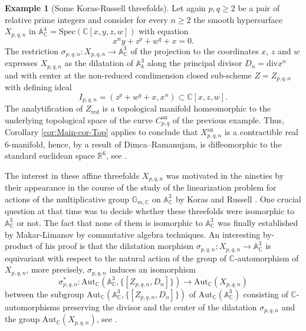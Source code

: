 \documentclass[10pt]{alggeom}
\renewcommand{\geq}{\geqslant}
\theoremstyle{definition}
\newtheorem{ex}[thm]{Example}
\numberwithin{equation}{section}
\begin{document}
\begin{ex}[Some Koras-Russell threefolds]
\label{exa:-KR-threefolds} Let again $p,q\geq2$ be a pair of relative
prime integers and consider for every $n\geq2$ the smooth hypersurface
$X_{p,q,n}$ in $\mathbb{A}_{\mathbb{C}}^{4}=\mathrm{Spec}(\mathbb{C}[x,y,z,w])$
with equation 
\[
x^{n}y+z^{p}+w^{q}+x=0.
\]
The restriction $\sigma_{p,q,n}:X_{p,q,n}\to\mathbb{A}_{\mathbb{C}}^{3}$
of the projection to the coordinates $x$, $z$ and $w$ expresses
$X_{p,q,n}$ as the dilatation of $\mathbb{A}_{k}^{3}$ along the
principal divisor $D_{n}=\mathrm{div}x^{n}$ and with center at the
non-reduced condimension closed sub-scheme $Z=Z_{p,q,n}$ with defining
ideal $$I_{p,q,n}=(z^{p}+w^{q}+x,x^{n})\subset\mathbb{C}[x,z,w].$$
The analytification of $Z_{\mathrm{red}}$ is a topological manifold
homeomorphic to the underlying topological space of the curve $C_{p,q}^{\mathrm{an}}$
of the previous example. Thus, Corollary \ref{cor:Main-cor-Top} applies
to conclude that $X_{p,q,n}^{\mathrm{an}}$ is a contractible real
$6$-manifold, hence, by a result of Dimca--Ramanujam, is diffeomorphic
to the standard euclidean space $\mathbb{R}^{6}$, see \cite[Theorem 3.2]{Zai00}. 

The interest in these affine threefolds $X_{p,q,n}$ was motivated
in the nineties by their appearance in the course of the study of
the linearization problem for actions of the multiplicative group $\mathbb{G}_{m,\mathbb{C}}$ on $\mathbb{A}_{\mathbb{C}}^{3}$
by Koras and Russell \cite{KR97}. One crucial question at that time
was to decide whether these threefolds were isomorphic to $\mathbb{A}_{\mathbb{C}}^{3}$
or not. The fact that none of them is isomorphic to $\mathbb{A}_{\mathbb{C}}^{3}$
was finally established by Makar-Limanov \cite{ML96} by commutative
algebra techniques. An interesting by-product of his proof is that
the dilatation morphism $\sigma_{p,q,n}:X_{p,q,n}\to\mathbb{A}_{\mathbb{C}}^{3}$
is equivariant with respect to the natural action of the group of
$\mathbb{C}$-automorphism of $X_{p,q,n}$, more precisely, $\sigma_{p,q,n}$
induces an isomorphism 
\[
\sigma_{p,q,n}^{*}:\mathrm{Aut}_{\mathbb{C}}(\mathbb{A}_{\mathbb{C}}^{3},\{[Z_{p,q,n},D_{n}]\})\to\mathrm{Aut}_{\mathbb{C}}(X_{p,q,n})
\]
between the subgroup $\mathrm{Aut}_{\mathbb{C}}(\mathbb{A}_{\mathbb{C}}^{3},\{[Z_{p,q,n},D_{n}]\})$
of $\mathrm{Aut}_{\mathbb{C}}(\mathbb{A}_{\mathbb{C}}^{3})$ consisting
of $\mathbb{C}$-automorphisms preserving the divisor and the center
of the dilatation $\sigma_{p,q,n}$ and the group $\mathrm{Aut}_{\mathbb{C}}(X_{p,q,n})$,
see \cite{MJ11}. 
\end{ex}
\end{document}
